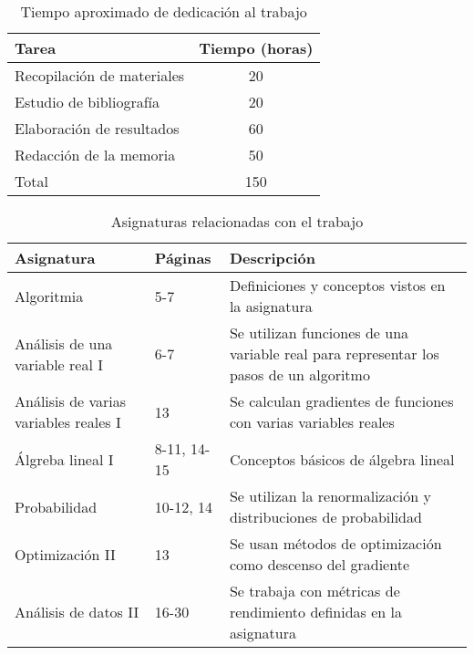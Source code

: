 \documentclass[12pt,twoside]{article}
\begin{document}
\begin{table}[H]
    \centering
    \begin{tabular}{l c}
        \hline
        Tarea & Tiempo (horas) \\
        \hline
        Recopilación de materiales & 20 \\
        Estudio de bibliografía & 20 \\
        Elaboración de resultados & 60 \\
        Redacción de la memoria & 50 \\
        \hline
        Total & 150 \\
        \hline
    \end{tabular}
    \caption{Tiempo aproximado de dedicación al trabajo}
    \label{tab:tiempo}
\end{table}

\begin{table}[H]
    \centering
    \begin{tabular}{l l p{7cm}}
        \hline
        Asignatura & Páginas & Descripción \\
        \hline
        Algoritmia & 5-7 & Definiciones y conceptos vistos en la asignatura \\
        Análisis de una variable real I & 6-7 & Se utilizan funciones de una variable real para representar los pasos de un algoritmo \\
        Análisis de varias variables reales I & 13 & Se calculan gradientes de funciones con varias variables reales \\
        Álgreba lineal I & 8-11, 14-15 & Conceptos básicos de álgebra lineal \\
        Probabilidad & 10-12, 14 & Se utilizan la renormalización y distribuciones de probabilidad \\
        Optimización II & 13 & Se usan métodos de optimización como descenso del gradiente \\ 
        Análisis de datos II & 16-30 & Se trabaja con métricas de rendimiento definidas en la asignatura \\
        \hline
    \end{tabular}
    \caption{Asignaturas relacionadas con el trabajo}
    \label{tab:asignaturas}
\end{table}
\end{document}
